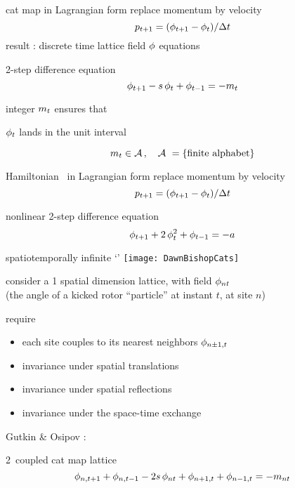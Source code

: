 \begin{frame}{cat map in Lagrangian form}
replace momentum by velocity
\[
p_{t+1}=(\phi_{t+1}  - \phi_{t})/\Delta t
\]
result : discrete time lattice field $\phi$ equations
\bigskip

\begin{block}{2-step difference equation}
\[
\phi_{t+1}  -  s \, \phi_{t} + \phi_{t-1}
    =
-{m_{t}}
\] %
\end{block}
integer ${m_{t}}$ ensures that

\hfill $\phi_{t}$ lands in the unit interval

\bigskip
\[
{m_{t}}\in  \mathcal{A}
\,,\quad \mathcal{A}\ = \{\mbox{finite alphabet}\}
\]
\end{frame} %

\begin{frame}{Hamiltonian \HenonMap\ in Lagrangian form}
replace momentum by velocity
\[
p_{t+1}=(\phi_{t+1}  - \phi_{t})/\Delta t
\]

\begin{block}{nonlinear 2-step difference equation}
\[
\phi_{t+1}  + 2\,\phi_{t}^2 + \phi_{t-1}
    =
-a
\] %
\end{block}
\end{frame} %

\begin{frame}{spatiotemporally infinite `\catlatt'}
\hfill\texttt{[image: DawnBishopCats]}
\end{frame} %

\begin{frame}{\catlatt}
consider
a 1 {\color{blue}spatial} dimension lattice, with field
$\phi_{nt}$ \\
(the angle of a kicked
rotor ``particle'' at instant $t$, at site $n$)
\begin{block}{require}
\begin{itemize}
\item  each site couples to
its nearest neighbors $\phi_{n\pm1,t}$
\item  invariance under
spatial translations
\item  invariance under spatial reflections
\item  invariance under the space-time exchange
\end{itemize}
\end{block}

\bigskip

Gutkin \& Osipov :
\begin{block}{2\dmn\ coupled cat map lattice}
\[
\phi_{n,t+1} + \phi_{n,t-1} - 2s \, \phi_{n t} + \phi_{n+1,t} + \phi_{n-1, t}
     =-{m_{n t}}
\] %
\end{block}
\end{frame} %

